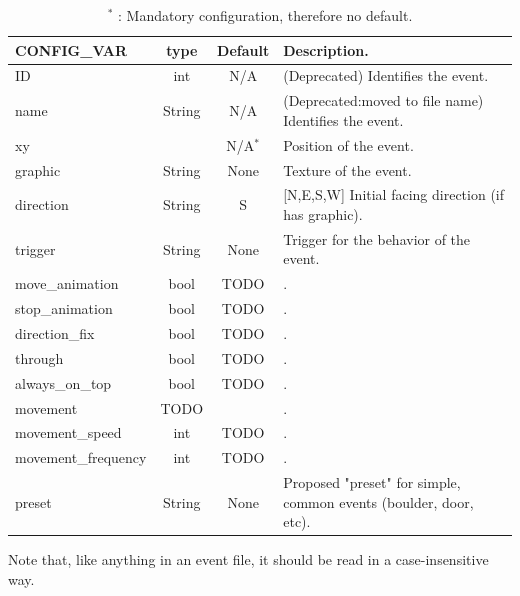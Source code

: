 \documentclass[11pt]{article}
\begin{document}
\begin{table}[!h]
	\centering
\begin{tabular}{|a|c|c|l|}
	\hline
	\textbf{CONFIG\_VAR} & \textbf{type} & \textbf{Default} & \textbf{Description}. \\
	\hline
	{\ttfamily ID} & {\ttfamily int} & N/A & (Deprecated) Identifies the event. \\
	\hline
	{\ttfamily name} & {\ttfamily String} & N/A & (Deprecated:moved to file name) Identifies the event. \\
	\hline
	{\ttfamily xy} & {} & N/A$^*$ & Position of the event. \\
	\hline
	{\ttfamily graphic} & {\ttfamily String} & None & Texture of the event. \\
	\hline
	{\ttfamily direction} & {\ttfamily String} & S & [N,E,S,W] Initial facing direction (if has {\ttfamily graphic}). \\
	\hline
	{\ttfamily trigger} & {\ttfamily String} & None & Trigger for the behavior of the event. \\
	\hline
	{\ttfamily move\_animation} & {\ttfamily bool} & TODO & . \\
	\hline
	{\ttfamily stop\_animation} & {\ttfamily bool} & TODO & . \\
	\hline
	{\ttfamily direction\_fix} & {\ttfamily bool} & TODO & . \\
	\hline
	{\ttfamily through} & {\ttfamily bool} & TODO & . \\
	\hline
	{\ttfamily always\_on\_top} & {\ttfamily bool} & TODO & . \\
	\hline
	{\ttfamily movement} & {\ttfamily TODO} &  & . \\
	\hline
	{\ttfamily movement\_speed} & {\ttfamily int} & TODO & . \\
	\hline
	{\ttfamily movement\_frequency} & {\ttfamily int} & TODO & . \\
	\hline
	{\ttfamily preset} & {\ttfamily String} & None & \parbox{0.51\linewidth}{\vspace{.2\baselineskip}Proposed "preset" for simple, common events (boulder, door, etc).} \\
	\hline
\end{tabular}
\caption*{$^*$ : Mandatory configuration, therefore no default.}
\end{table}

Note that, like anything in an event file, it should be read in a case-insensitive way.
\end{document}
